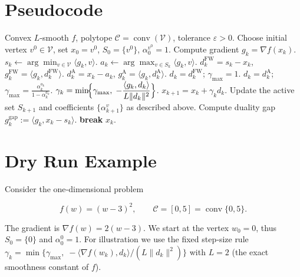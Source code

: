 \documentclass{article}
\begin{document}
\section*{Pseudocode}
\begin{algorithm}[H]
\caption{Away‑Step Frank–Wolfe (AFW)}\label{alg:AFW}
\begin{algorithmic}[1]
\REQUIRE Convex $L$‑smooth $f$, polytope $\mathcal{C}= \operatorname{conv}(\mathcal{V})$, tolerance $\varepsilon>0$.
\STATE Choose initial vertex $v^{0}\in\mathcal{V}$, set $x_{0}=v^{0}$, $S_{0}=\{v^{0}\}$, $\alpha_{0}^{v^{0}}=1$.
    \STATE Compute gradient $g_{k}= \nabla f(x_{k})$.
    \STATE $s_{k}\gets \arg\min_{v\in\mathcal{V}}\langle g_{k},v\rangle$.
    \STATE $a_{k}\gets \arg\max_{v\in S_{k}}\langle g_{k},v\rangle$.
    \STATE $d^{\mathrm{FW}}_{k}=s_{k}-x_{k}$, $g^{\mathrm{FW}}_{k}= \langle g_{k},d^{\mathrm{FW}}_{k}\rangle$.
    \STATE $d^{\mathrm{A}}_{k}=x_{k}-a_{k}$, $g^{\mathrm{A}}_{k}= \langle g_{k},d^{\mathrm{A}}_{k}\rangle$.
        \STATE $d_{k}=d^{\mathrm{FW}}_{k}$; $\gamma_{\max}=1$.
    \ELSE
        \STATE $d_{k}=d^{\mathrm{A}}_{k}$; $\displaystyle\gamma_{\max}= \frac{\alpha_{k}^{a_{k}}}{1-\alpha_{k}^{a_{k}}}$.
    \ENDIF
    \STATE $\displaystyle\gamma_{k}= \min\!\Bigl\{\gamma_{\max},\;
          -\frac{\langle g_{k},d_{k}\rangle}{L\|d_{k}\|^{2}}\Bigr\}$.
    \STATE $x_{k+1}=x_{k}+ \gamma_{k}d_{k}$.
    \STATE Update the active set $S_{k+1}$ and coefficients $\{\alpha_{k+1}^{v}\}$ as described above.
    \STATE Compute duality gap $g_{k}^{\text{gap}}:=\langle g_{k},x_{k}-s_{k}\rangle$.
        \STATE \textbf{break}
    \ENDIF
\ENDFOR
\RETURN $x_{k}$.
\end{algorithmic}
\end{algorithm}

\section*{Dry Run Example}
Consider the one‑dimensional problem  

\[
f(w)=(w-3)^{2},\qquad\mathcal{C}=[0,5]=\operatorname{conv}\{0,5\}.
\]

The gradient is $\nabla f(w)=2(w-3)$.  
We start at the vertex $w_{0}=0$, thus $S_{0}=\{0\}$ and $\alpha_{0}^{0}=1$.
For illustration we use the fixed step‑size rule $\gamma_{k}= \min\{ \gamma_{\max},\; -\langle\nabla f(w_{k}),d_{k}\rangle/(L\|d_{k}\|^{2})\}$ with $L=2$ (the exact smoothness constant of $f$).
\end{document}
